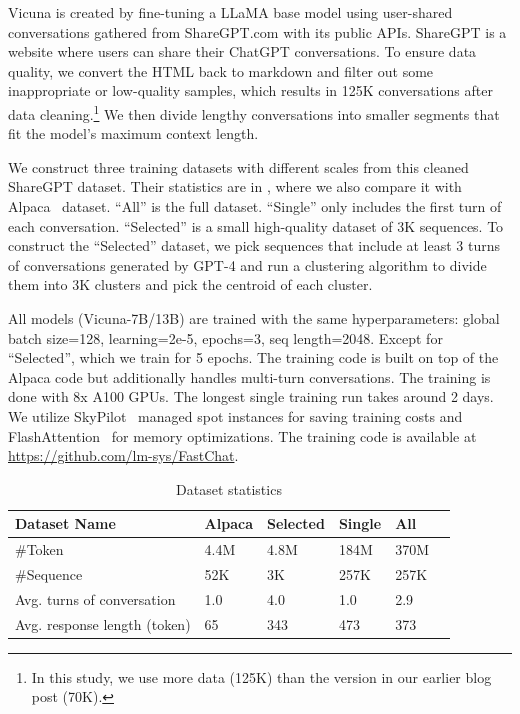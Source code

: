 Vicuna is created by fine-tuning a LLaMA base model using user-shared conversations gathered from ShareGPT.com with its public APIs.
ShareGPT is a website where users can share their ChatGPT conversations.
To ensure data quality, we convert the HTML back to markdown and filter out some inappropriate or low-quality samples, which results in 125K conversations after data cleaning.\footnote{In this study, we use more data (125K) than the version in our earlier blog post (70K).}
We then divide lengthy conversations into smaller segments that fit the model's maximum context length.

We construct three training datasets with different scales from this cleaned ShareGPT dataset. Their statistics are in , where we also compare it with Alpaca~\cite{alpaca} dataset. ``All'' is the full dataset. ``Single'' only includes the first turn of each conversation. ``Selected'' is a small high-quality dataset of 3K sequences. To construct the ``Selected'' dataset, we pick sequences that include at least 3 turns of conversations generated by GPT-4 and run a clustering algorithm to divide them into 3K clusters and pick the centroid of each cluster.

All models (Vicuna-7B/13B) are trained with the same hyperparameters: global batch size=128, learning=2e-5, epochs=3, seq length=2048. Except for ``Selected'', which we train for 5 epochs.
The training code is built on top of the Alpaca code but additionally handles multi-turn conversations.
The training is done with 8x A100 GPUs. The longest single training run takes around 2 days.
We utilize SkyPilot~\cite{skypilot} managed spot instances for saving training costs and FlashAttention~\cite{dao2022flashattention} for memory optimizations.
The training code is available at \url{https://github.com/lm-sys/FastChat}.


\begin{table}[h]
\centering
\caption{Dataset statistics}
\label{table:dataset_stats}
\footnotesize
\begin{tabular}{llllll}
\toprule
Dataset Name                 & Alpaca  & Selected & Single   & All   \\
\midrule
\#Token                      & 4.4M    & 4.8M     & 184M     & 370M  \\
\#Sequence                   & 52K     & 3K       & 257K     & 257K  \\
Avg. turns of conversation   & 1.0     & 4.0      & 1.0      & 2.9   \\
Avg. response length (token) & 65      & 343      & 473      & 373   \\
\bottomrule
\end{tabular}
\end{table}

